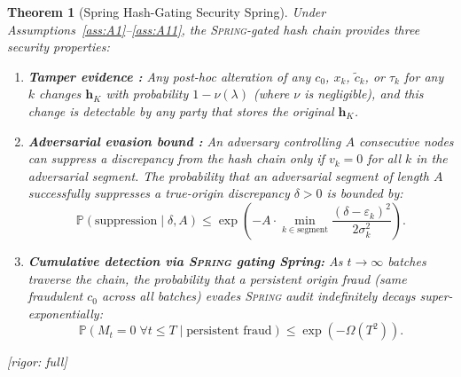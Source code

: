 \documentclass[11pt,a4paper]{article}
\newtheorem{theorem}{Theorem}[section]
\theoremstyle{definition}
\theoremstyle{remark}
\newcommand{\rigorFull}{\textcolor{green!60!black}{[rigor: full]}}
\newcommand{\Spring}{\textsc{Spring}}
\newcommand{\Pbb}{\mathbb{P}}
\newcommand{\hashChain}{\mathbf{h}}
\begin{document}
\begin{theorem}[Spring Hash-Gating Security Spring]
\label{thm:spring_hash}
Under Assumptions~\ref{ass:A1}--\ref{ass:A11}, the \Spring{}-gated hash chain provides three security properties:

\begin{enumerate}[label=(\roman*)]
    \item \textbf{Tamper evidence :} Any post-hoc alteration of any $c_0$, $x_k$, $\tilde{c}_k$, or $\tau_k$ for any $k$ changes $\hashChain_K$ with probability $1 - \nu(\lambda)$ (where $\nu$ is negligible), and this change is detectable by any party that stores the original $\hashChain_K$.
    
    \item \textbf{Adversarial evasion bound :} An adversary controlling $A$ consecutive nodes can suppress a discrepancy from the hash chain only if $v_k = 0$ for all $k$ in the adversarial segment. The probability that an adversarial segment of length $A$ successfully suppresses a true-origin discrepancy $\delta > 0$ is bounded by:
    \begin{equation}
        \Pbb(\text{suppression} \mid \delta, A) \leq \exp\left(-A \cdot \min_{k \in \text{segment}} \frac{(\delta - \varepsilon_k)^2}{2\sigma_k^2}\right).
        \label{eq:suppression_bound}
    \end{equation}
    
    \item \textbf{Cumulative detection via \Spring{} gating Spring:} As $t \to \infty$ batches traverse the chain, the probability that a persistent origin fraud (same fraudulent $c_0$ across all batches) evades \Spring{} audit indefinitely decays super-exponentially:
    \begin{equation}
        \Pbb(M_t = 0 \;\forall t \leq T \mid \text{persistent fraud}) \leq \exp\left(-\Omega(T^2)\right).
        \label{eq:cumulative_detection}
    \end{equation}
\end{enumerate}
\rigorFull
\end{theorem}
\end{document}
